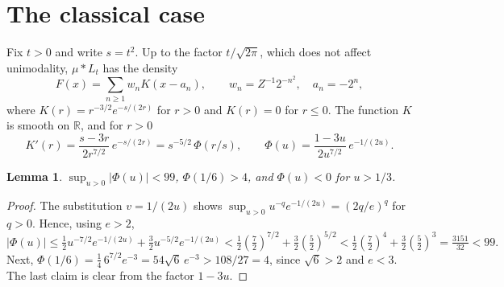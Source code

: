 \documentclass[11pt]{amsart}
\newtheorem{lemma}[theorem]{Lemma}
\theoremstyle{definition}
\theoremstyle{remark}
\numberwithin{equation}{section}
\newcommand{\R}{\mathbb{R}}
\begin{document}
\section{The classical case}\label{sec:classical}

Fix $t>0$ and write $s=t^2$. Up to the factor $t/\sqrt{2\pi}$, which does not affect unimodality, $\mu*L_t$ has the density
\begin{equation}\label{eq:Ft}
F(x)=\sum_{n\ge1}w_n K(x-a_n),\qquad w_n=Z^{-1}2^{-n^2},\quad a_n=-2^n,
\end{equation}
where $K(r)=r^{-3/2}e^{-s/(2r)}$ for $r>0$ and $K(r)=0$ for $r\le0$. The function $K$ is smooth on $\R$, and for $r>0$
\begin{equation}\label{eq:Kprime}
K'(r)=\frac{s-3r}{2r^{7/2}}\,e^{-s/(2r)}=s^{-5/2}\,\Phi(r/s),\qquad \Phi(u)=\frac{1-3u}{2u^{7/2}}\,e^{-1/(2u)} .
\end{equation}

\begin{lemma}\label{lem:Phi}
$\sup_{u>0}|\Phi(u)|<99$, $\Phi(1/6)>4$, and $\Phi(u)<0$ for $u>1/3$.
\end{lemma}

\begin{proof}
The substitution $v=1/(2u)$ shows $\sup_{u>0}u^{-q}e^{-1/(2u)}=(2q/e)^q$ for $q>0$. Hence, using $e>2$,
\[
|\Phi(u)|\le\tfrac12u^{-7/2}e^{-1/(2u)}+\tfrac32u^{-5/2}e^{-1/(2u)}<\tfrac12\left(\tfrac72\right)^{7/2}+\tfrac32\left(\tfrac52\right)^{5/2}<\tfrac12\left(\tfrac72\right)^{4}+\tfrac32\left(\tfrac52\right)^{3}=\tfrac{3151}{32}<99 .
\]
Next, $\Phi(1/6)=\frac14\,6^{7/2}e^{-3}=54\sqrt6\,e^{-3}>108/27=4$, since $\sqrt6>2$ and $e<3$. The last claim is clear from the factor $1-3u$.
\end{proof}
\end{document}
